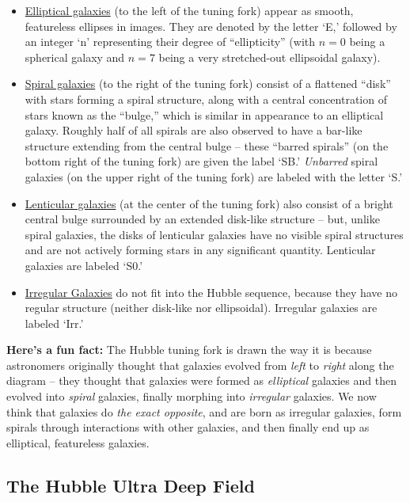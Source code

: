 \documentclass[11pt]{article}
\begin{document}
\begin{itemize}
    \item \underline{Elliptical galaxies} (to the left of the tuning fork) appear as smooth, featureless ellipses in images. They are denoted by the letter `E,' followed by an integer `n' representing their degree of ``ellipticity'' (with $n=0$ being a spherical galaxy and $n=7$ being a very stretched-out ellipsoidal galaxy).
    
    \item \underline{Spiral galaxies} (to the right of the tuning fork) consist of a flattened ``disk'' with stars forming a spiral structure, along with a central concentration of stars known as the ``bulge,'' which is similar in appearance to an elliptical galaxy. Roughly half of all spirals are also observed to have a bar-like structure extending from the central bulge -- these ``barred spirals'' (on the bottom right of the tuning fork) are given the label `SB.' \emph{Unbarred} spiral galaxies (on the upper right of the tuning fork) are labeled with the letter `S.' 
    
    \item \underline{Lenticular galaxies} (at the center of the tuning fork) also consist of a bright central bulge surrounded by an extended disk-like structure -- but, unlike spiral galaxies, the disks of lenticular galaxies have no visible spiral structures and are not actively forming stars in any significant quantity. Lenticular galaxies are labeled `S0.'
    
    \item \underline{Irregular Galaxies} do not fit into the Hubble sequence, because they have no regular structure (neither disk-like nor ellipsoidal). Irregular galaxies are labeled `Irr.'
\end{itemize}


\noindent
\textbf{Here's a fun fact:} The Hubble tuning fork is drawn the way it is because astronomers originally thought that galaxies evolved from \emph{left} to \emph{right} along the diagram -- they thought that galaxies were formed as \textit{elliptical} galaxies and then evolved into \textit{spiral} galaxies, finally morphing into \textit{irregular} galaxies. We now think that galaxies do \emph{the exact opposite}, and are born as irregular galaxies, form spirals through interactions with other galaxies, and then finally end up as elliptical, featureless galaxies.
\medskip

\subsection{The Hubble Ultra Deep Field}
\end{document}

